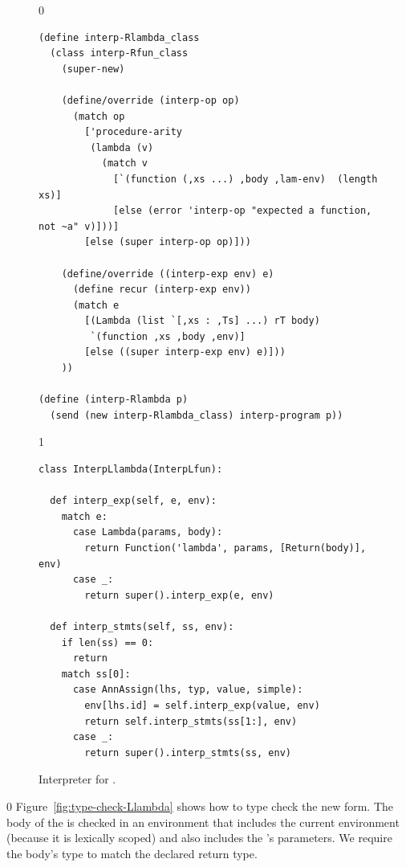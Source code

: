 \documentclass[7x10,nocrop]{TimesAPriori_MIT}%
\def\racketEd{0}
\def\pythonEd{1}
\def\edition{1}
\begin{document}
\begin{figure}[tbp]
{\if\edition\racketEd 
\begin{lstlisting}
(define interp-Rlambda_class
  (class interp-Rfun_class
    (super-new)

    (define/override (interp-op op)
      (match op
        ['procedure-arity
         (lambda (v)
           (match v
             [`(function (,xs ...) ,body ,lam-env)  (length xs)]
             [else (error 'interp-op "expected a function, not ~a" v)]))]
        [else (super interp-op op)]))

    (define/override ((interp-exp env) e)
      (define recur (interp-exp env))
      (match e
        [(Lambda (list `[,xs : ,Ts] ...) rT body)
         `(function ,xs ,body ,env)]
        [else ((super interp-exp env) e)]))
    ))

(define (interp-Rlambda p)
  (send (new interp-Rlambda_class) interp-program p))
\end{lstlisting}
\fi}
{\if\edition\pythonEd
\begin{lstlisting}
class InterpLlambda(InterpLfun):

  def interp_exp(self, e, env):
    match e:
      case Lambda(params, body):
        return Function('lambda', params, [Return(body)], env)
      case _:
        return super().interp_exp(e, env)
    
  def interp_stmts(self, ss, env):
    if len(ss) == 0:
      return
    match ss[0]:
      case AnnAssign(lhs, typ, value, simple):
        env[lhs.id] = self.interp_exp(value, env)
        return self.interp_stmts(ss[1:], env)
      case _:
        return super().interp_stmts(ss, env)
\end{lstlisting}
\fi}
\caption{Interpreter for \LangLam{}.}
\label{fig:interp-Rlambda}
\end{figure}


\label{sec:type-check-r5}

{\if\edition\racketEd
%
Figure~\ref{fig:type-check-Llambda} shows how to type check the new
 form. The body of the  is checked in an
environment that includes the current environment (because it is
lexically scoped) and also includes the 's parameters.  We
require the body's type to match the declared return type.
%
\fi}
\end{document}
